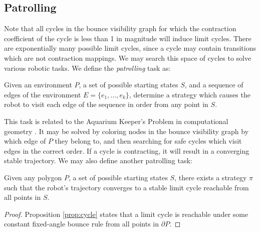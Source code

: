 \documentclass[]{styles/svproc}  %
\begin{document}


\subsection{Patrolling}

Note that all cycles in the bounce visibility graph for which the contraction coefficient of
the cycle is less than 1 in magnitude will induce limit cycles. There are
exponentially many possible limit cycles, since a cycle may contain
transitions which are not contraction mappings. We may search this space of cycles to
solve various robotic tasks. We define the \emph{patrolling} task as:

\begin{definition}
Given an environment $P$, a set of possible starting states $S$, and
a sequence of edges of the environment $E = \{e_1, \ldots, e_k\}$,
determine a strategy which causes the robot to visit each edge of the sequence
in order from any point in $S$.
\end{definition}

This task is related to the Aquarium Keeper's Problem in computational
geometry \cite{czyzowicz1991aquarium}. It may be solved by coloring nodes in the
bounce visibility graph by which edge of $P$ they belong to, and then searching
for safe cycles which visit edges in the correct order. If a cycle is
contracting, it will result in a converging stable trajectory. 
We may also define another patrolling task:

\begin{proposition}
Given any polygon $P$, a set of possible starting states $S$, 
there exists a strategy $\pi$ such that the robot's trajectory 
converges to a stable limit cycle reachable from all points in $S$.
\end{proposition}

\begin{proof}
Proposition \ref{prop:cycle}
states that a limit cycle is reachable under some constant fixed-angle bounce 
rule from all points in $\partial P$.
\end{proof}
\end{document}
